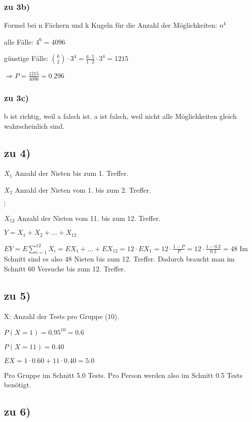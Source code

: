 \subsubsection{zu 3b)}
Formel bei n Fächern und k Kugeln für die Anzahl der Möglichkeiten: $ n^k $

alle Fälle: $4^6 = 4096 $

günstige Fälle: $ \binom 6 2 \cdot 3^4 = \frac{6\cdot 5}{1\cdot 2} \cdot 3^4 = 1215 $   

$\Rightarrow P = \frac{1215}{4096} = 0.296$

\subsubsection{zu 3c)}
b ist richtig, weil a falsch ist. a ist falsch, weil nicht alle Möglichkeiten gleich wahrscheinlich sind. 

\subsection{zu 4)}
$ X_1 $ Anzahl der Nieten bis zum 1. Treffer. 

$ X_2 $ Anzahl der Nieten vom 1. bis zum 2. Treffer. 

$ \vdots $

$ X_{12} $ Anzahl der Nieten vom 11. bis zum 12. Treffer. 

$ Y = X_1 + X_2 + ... + X_{12}$

$EY = E \sum_{i=1}^{12} X_i = EX_1 + ... + EX_{12} = 12\cdot EX_1 = 12 \cdot \frac{1-P}{P} = 12\cdot \frac{1-0.2}{0.2} = 48$ 
Im Schnitt sind es also 48 Nieten bis zum 12. Treffer. Dadurch braucht man im Schnitt 60 Versuche bis zum 12. Treffer. 

\subsection{zu 5)}
X: Anzahl der Tests pro Gruppe (10).

$ P(X=1) = 0.95^{10} = 0.6 $

$ P(X=11) = 0.40 $

$ EX = 1\cdot 0.60 + 11\cdot 0.40 = 5.0$

Pro Gruppe im Schnitt 5.0 Tests. Pro Person werden also im Schnitt 0.5 Tests benötigt. \\

\subsection{zu 6)}

